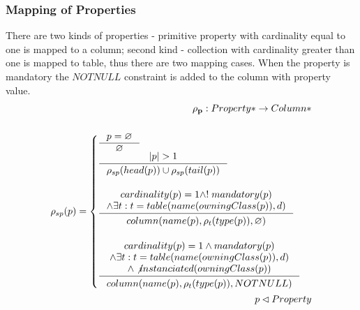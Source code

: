\documentclass[11pt]{article}
\begin{document}
\subsubsection{Mapping of Properties}
There are two kinds of properties - primitive property with cardinality equal to one is mapped to a column; second kind - collection with cardinality greater than one is mapped to table, thus there are two mapping cases. When the property is mandatory the $NOTNULL$ constraint is added to the column with property value. 
\begin{align*}
	\mathbf{\rho_p} : Property* \rightarrow Column* \\ \\
	\rho_{sp}(p) = \begin{cases}
		\inference{p = \varnothing}{\varnothing}\\
		\inference{|p| > 1}{\rho_{sp}(head(p)) \cup \rho_{sp}(tail(p))}\\\\
 		\inference{cardinality(p) = 1 \wedge !\;mandatory(p)
 			\\ \wedge \exists t : t = table(name(owningClass(p)), d) 
		 }{\begin{gathered}
	  		column(name(p), \rho_t(type(p)), \varnothing )
		\end{gathered}} \\ \\
  		\inference{cardinality(p) = 1 \wedge mandatory(p)
			 \\ \wedge \exists t : t = table(name(owningClass(p)), d)
			\\ \wedge \not instanciated(owningClass(p))
		}{\begin{gathered}
 	 		column(name(p), \rho_t(type(p)), NOTNULL ) \\ 
		\end{gathered}}
	\end{cases}\\
	p \lhd Property
\end{align*}
\end{document}
